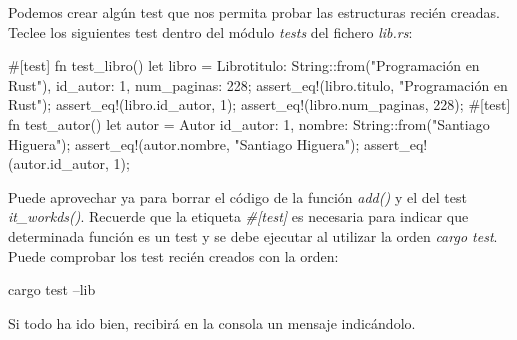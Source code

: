 \documentclass[a4paper,11pt]{extarticle}
\begin{document}
Podemos crear algún test que nos permita probar las estructuras recién creadas. Teclee los siguientes test dentro del módulo \textit{tests} del fichero \textit{lib.rs}:

\vspace{0.7em}
\begin{Codigo2}
#[test]
fn test_libro() {
    let libro = Libro{titulo: String::from("Programación en Rust"),
        id_autor: 1, num_paginas: 228};
    assert_eq!(libro.titulo, "Programación en Rust");
    assert_eq!(libro.id_autor, 1);
    assert_eq!(libro.num_paginas, 228);
}
#[test]
fn test_autor() {
    let autor = Autor {id_autor: 1,
        nombre: String::from("Santiago Higuera")};
    assert_eq!(autor.nombre, "Santiago Higuera");
    assert_eq!(autor.id_autor, 1);
}    
\end{Codigo2}

Puede aprovechar ya para borrar el código de la función \textit{add()} y el del test \textit{it\_workds()}. Recuerde que la etiqueta \textit{\#[test]} es necesaria para indicar que determinada función es un test y se debe ejecutar al utilizar la orden \textit{cargo test}. Puede comprobar los test recién creados con la orden:

\vspace{0.7em}
\begin{Codigo2}
cargo test --lib
\end{Codigo2}

Si todo ha ido bien, recibirá en la consola un mensaje indicándolo.






\end{document}
